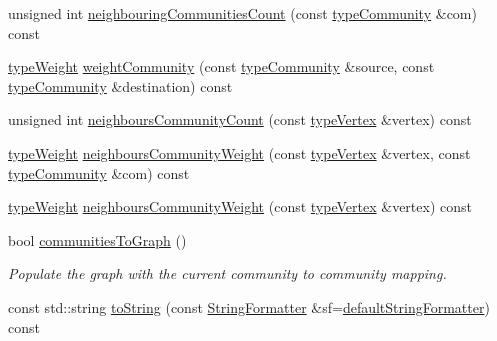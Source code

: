 \begin{DoxyCompactItemize}
\item 
unsigned int \hyperlink{classGraphUndirectedGroupable_aaf488071a0e3b6cf96b29ae1af8df02f}{neighbouring\+Communities\+Count} (const \hyperlink{graphUndirectedGroupable_8h_a914da95c9ea7f14f4b7f875c36818556}{type\+Community} \&com) const
\item 
\hyperlink{edge_8h_a2e7ea3be891ac8b52f749ec73fee6dd2}{type\+Weight} \hyperlink{classGraphUndirectedGroupable_a2884361f00176ac8f16afca6feb3e404}{weight\+Community} (const \hyperlink{graphUndirectedGroupable_8h_a914da95c9ea7f14f4b7f875c36818556}{type\+Community} \&source, const \hyperlink{graphUndirectedGroupable_8h_a914da95c9ea7f14f4b7f875c36818556}{type\+Community} \&destination) const
\item 
unsigned int \hyperlink{classGraphUndirectedGroupable_ae70ef901c94e0d117abbaa5cd64a63e6}{neighbours\+Community\+Count} (const \hyperlink{edge_8h_a5fbd20c46956d479cb10afc9855223f6}{type\+Vertex} \&vertex) const
\item 
\hyperlink{edge_8h_a2e7ea3be891ac8b52f749ec73fee6dd2}{type\+Weight} \hyperlink{classGraphUndirectedGroupable_a23551b49c2cbf1b533e300af5c1f20da}{neighbours\+Community\+Weight} (const \hyperlink{edge_8h_a5fbd20c46956d479cb10afc9855223f6}{type\+Vertex} \&vertex, const \hyperlink{graphUndirectedGroupable_8h_a914da95c9ea7f14f4b7f875c36818556}{type\+Community} \&com) const
\item 
\hyperlink{edge_8h_a2e7ea3be891ac8b52f749ec73fee6dd2}{type\+Weight} \hyperlink{classGraphUndirectedGroupable_a41c4955a6238924a861fe18e8d7a9ee9}{neighbours\+Community\+Weight} (const \hyperlink{edge_8h_a5fbd20c46956d479cb10afc9855223f6}{type\+Vertex} \&vertex) const
\item 
bool \hyperlink{classGraphUndirectedGroupable_af6fc2c9e8aad7c6bce37d30eeaf184a8}{communities\+To\+Graph} ()
\begin{DoxyCompactList}\small\item\em Populate the graph with the current community to community mapping. \end{DoxyCompactList}\item 
const std\+::string \hyperlink{classGraphUndirectedGroupable_a615f30036acfdd33e45b82dc47e7d174}{to\+String} (const \hyperlink{classStringFormatter}{String\+Formatter} \&sf=\hyperlink{stringFormatter_8h_abf1349c8e24162d0134072aff288f2a2}{default\+String\+Formatter}) const
\end{DoxyCompactItemize}
